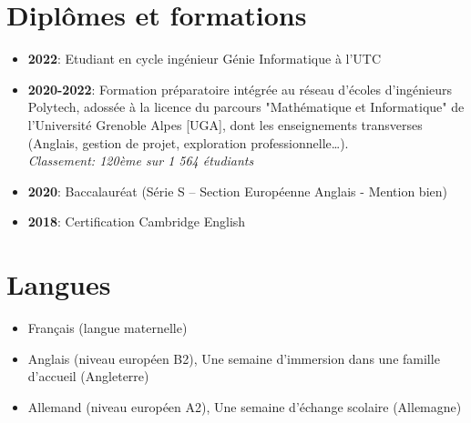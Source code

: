 \documentclass[9pt, oneside, a4paper, titlepage]{extarticle}
\begin{document}
\begin{tcolorbox}
\begin{minipage}[t]{12.8cm}
\begin{tcolorbox}[grow to right by = 0.6cm, colback = gray!25, colframe = white]
                \section*{Diplômes et formations }
                \begin{itemize}
                    \item \textbf{2022}: Etudiant en cycle ingénieur Génie Informatique à l'UTC             
                    \item \textbf{2020-2022}: Formation préparatoire intégrée au réseau d’écoles d’ingénieurs Polytech, adossée à la licence du parcours "Mathématique et Informatique" de l’Université Grenoble Alpes [UGA], dont les enseignements transverses (Anglais, gestion de projet, exploration professionnelle\ldots).\\\emph{Classement: 120ème sur 1 564 étudiants}
                    \item \textbf{2020}: Baccalauréat (Série S – Section Européenne Anglais - Mention bien)                 
                    \item \textbf{2018}: Certification Cambridge English
                \end{itemize}

                    \section*{Langues}
                    \begin{itemize}
                        \item Français (langue maternelle)
                        \item Anglais (niveau européen B2), Une semaine d'immersion dans une famille d'accueil (Angleterre)
                        \item Allemand (niveau européen A2), Une semaine d'échange scolaire (Allemagne)
                    \end{itemize}
                    \vspace*{0.1mm}
            \end{tcolorbox}
        \end{minipage}
    \end{tcolorbox}
\end{document}

